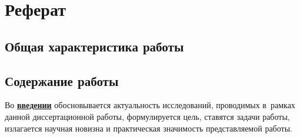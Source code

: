 \chapter*{Реферат}
\section*{Общая характеристика работы}

	\newcommand{\actuality}{\underline{\textbf{\actualityTXT}}}
	\newcommand{\progress}{\underline{\textbf{\progressTXT}}}
	\newcommand{\aim}{\underline{{\textbf\aimTXT}}}
	\newcommand{\tasks}{\underline{\textbf{\tasksTXT}}}
	\newcommand{\novelty}{\underline{\textbf{\noveltyTXT}}}
	\newcommand{\influence}{\underline{\textbf{\influenceTXT}}}
	\newcommand{\methods}{\underline{\textbf{\methodsTXT}}}
	\newcommand{\defpositions}{\underline{\textbf{\defpositionsTXT}}}
	\newcommand{\reliability}{\underline{\textbf{\reliabilityTXT}}}
	\newcommand{\probation}{\underline{\textbf{\probationTXT}}}
	\newcommand{\contribution}{\underline{\textbf{\contributionTXT}}}
	\newcommand{\publications}{\underline{\textbf{\publicationsTXT}}}
	




 \section*{Содержание работы}
 Во \underline{\textbf{введении}} обосновывается актуальность
 исследований, проводимых в~рамках данной диссертационной работы,
  формулируется цель, ставятся задачи работы, излагается научная новизна
 и практическая значимость представляемой работы. 

